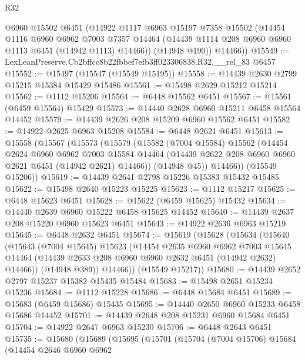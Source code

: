 \begin{lexlean}{R32}
\begin{coremodule}
        @6960
        @15502
        @6451
        (@14922
          @1117
          @6963
          @15197
          @7358
          @15502
          (@14454
            @1116
            @6960
            @6962
            @7003
            @7357
            @14464
            (@14439 @1114 @208 @6960 @6960 @1113 @6451 (@14942 @1113) @14466))
          (@14948 @190))
        @14466))
@15549 := LexLeanPreserve.Cb2bffcc8b22fbbef7efb3ff023306838.R32.__rel_83 @6457
@15552 := @15497 (@15547 (@15549 @15195))
@15558 := @14439 @2630 @2799 @15215 @15384 @15429 @15486
@15561 := @15498 @2629 @15212 @15214
@15562 := @1112 @15206
@15564 := @6448 @15562 @6451
@15567 := @15561 (@6459 @15564) @15429
@15573 := @14440 @2628 @6960 @15211 @6458 @15564 @14452
@15579 := @14439 @2626 @208 @15209 @6960 @15562 @6451
@15582 := @14922 @2625 @6963 @15208
@15584 := @6448 @2621 @6451
@15613 := @15558
    (@15567
      (@15573
        (@15579
          (@15582
            (@7004 @15584)
            @15562
            (@14454
              @2624
              @6960
              @6962
              @7003
              @15584
              @14464
              (@14439 @2622 @208 @6960 @6960 @2621 @6451 (@14942 @2621) @14466))
            (@14948 @45))
          @14466))
      (@15549 @15206))
@15619 := @14439 @2641 @2798 @15226 @15383 @15432 @15485
@15622 := @15498 @2640 @15223 @15225
@15623 := @1112 @15217
@15625 := @6448 @15623 @6451
@15628 := @15622 (@6459 @15625) @15432
@15634 := @14440 @2639 @6960 @15222 @6458 @15625 @14452
@15640 := @14439 @2637 @208 @15220 @6960 @15623 @6451
@15643 := @14922 @2636 @6963 @15219
@15645 := @6448 @2632 @6451
@15674 := @15619
    (@15628
      (@15634
        (@15640
          (@15643
            (@7004 @15645)
            @15623
            (@14454
              @2635
              @6960
              @6962
              @7003
              @15645
              @14464
              (@14439 @2633 @208 @6960 @6960 @2632 @6451 (@14942 @2632) @14466))
            (@14948 @389))
          @14466))
      (@15549 @15217))
@15680 := @14439 @2652 @2797 @15237 @15382 @15435 @15484
@15683 := @15498 @2651 @15234 @15236
@15684 := @1112 @15228
@15686 := @6448 @15684 @6451
@15689 := @15683 (@6459 @15686) @15435
@15695 := @14440 @2650 @6960 @15233 @6458 @15686 @14452
@15701 := @14439 @2648 @208 @15231 @6960 @15684 @6451
@15704 := @14922 @2647 @6963 @15230
@15706 := @6448 @2643 @6451
@15735 := @15680
    (@15689
      (@15695
        (@15701
          (@15704
            (@7004 @15706)
            @15684
            (@14454
              @2646
              @6960
              @6962

\end{coremodule}
\end{lexlean}
